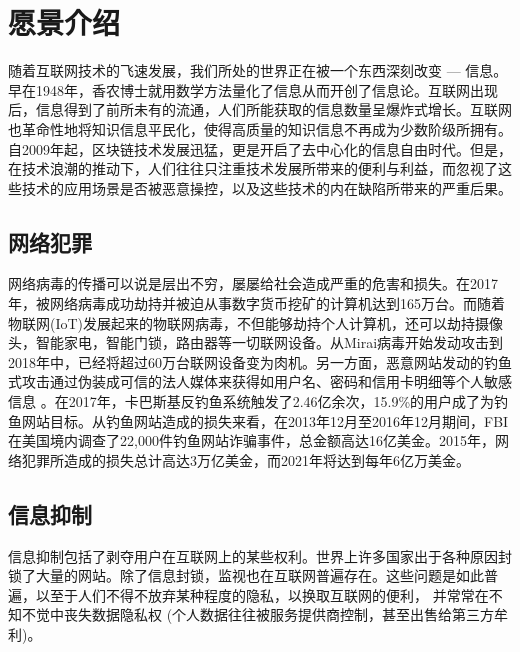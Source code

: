 \documentclass[a4paper]{article}
\begin{document}
\newpage

\tableofcontents

\newpage
\section{愿景介绍}
随着互联网技术的飞速发展，我们所处的世界正在被一个东西深刻改变 --- 信息。早在1948年，香农博士就用数学方法量化了信息从而开创了信息论\cite{shannon2001}。互联网出现后，信息得到了前所未有的流通，人们所能获取的信息数量呈爆炸式增长。互联网也革命性地将知识信息平民化，使得高质量的知识信息不再成为少数阶级所拥有。自2009年起，区块链技术发展迅猛，更是开启了去中心化的信息自由时代。但是，在技术浪潮的推动下，人们往往只注重技术发展所带来的便利与利益，而忽视了这些技术的应用场景是否被恶意操控，以及这些技术的内在缺陷所带来的严重后果。

\subsection{网络犯罪}
网络病毒的传播可以说是层出不穷，屡屡给社会造成严重的危害和损失\cite{timeline-computer-viruses}。在2017年，被网络病毒成功劫持并被迫从事数字货币挖矿的计算机达到165万台\cite{hijacking-mining}。而随着物联网(IoT)发展起来的物联网病毒，不但能够劫持个人计算机，还可以劫持摄像头，智能家电，智能门锁，路由器等一切联网设备。从Mirai病毒\cite{mirai}开始发动攻击到2018年中，已经将超过60万台联网设备变为肉机\cite{study-ddos-iot}。另一方面，恶意网站发动的钓鱼式攻击通过伪装成可信的法人媒体来获得如用户名、密码和信用卡明细等个人敏感信息 \cite{phishing}。在2017年，卡巴斯基反钓鱼系统触发了2.46亿余次，15.9\%的用户成了为钓鱼网站目标\cite{spam-phishing}。从钓鱼网站造成的损失来看，在2013年12月至2016年12月期间，FBI在美国境内调查了22,000件钓鱼网站诈骗事件，总金额高达16亿美金\cite{phishing-scam}。2015年，网络犯罪所造成的损失总计高达3万亿美金，而2021年将达到每年6亿万美金\cite{cybercrime-damages}。

\subsection{信息抑制}
信息抑制包括了剥夺用户在互联网上的某些权利\cite{block-internet}。世界上许多国家出于各种原因封锁了大量的网站\cite{list-blocked-india}\cite{list-blocked-russia}\cite{websites-blocked-china}。除了信息封锁，监视也在互联网普遍存在。这些问题是如此普遍，以至于人们不得不放弃某种程度的隐私，以换取互联网的便利\cite{private-security}， 并常常在不知不觉中丧失数据隐私权\cite{privacy-awareness} (个人数据往往被服务提供商控制，甚至出售给第三方牟利\cite{isp-sell-data}\cite{kosinski2013private})。\\
\end{document}
